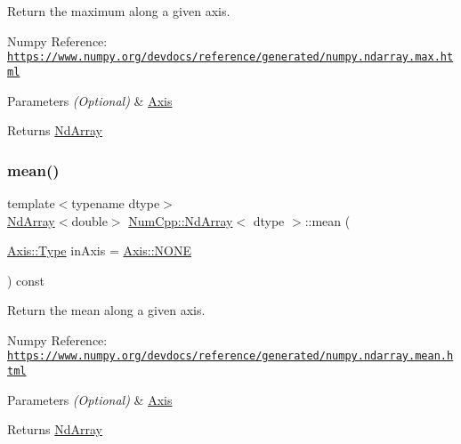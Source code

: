 Return the maximum along a given axis.

Numpy Reference\+: \href{https://www.numpy.org/devdocs/reference/generated/numpy.ndarray.max.html}{\tt https\+://www.\+numpy.\+org/devdocs/reference/generated/numpy.\+ndarray.\+max.\+html}


\begin{DoxyParams}{Parameters}
{\em (\+Optional)} & \mbox{\hyperlink{struct_num_cpp_1_1_axis}{Axis}} \\
\hline
\end{DoxyParams}
\begin{DoxyReturn}{Returns}
\mbox{\hyperlink{class_num_cpp_1_1_nd_array}{Nd\+Array}} 
\end{DoxyReturn}
\mbox{\label{class_num_cpp_1_1_nd_array_a8c5037810903a59d43d59e9056217191}} 
\subsubsection{\texorpdfstring{mean()}{mean()}}
{\footnotesize\ttfamily template$<$typename dtype$>$ \\
\mbox{\hyperlink{class_num_cpp_1_1_nd_array}{Nd\+Array}}$<$double$>$ \mbox{\hyperlink{class_num_cpp_1_1_nd_array}{Num\+Cpp\+::\+Nd\+Array}}$<$ dtype $>$\+::mean (\begin{DoxyParamCaption}\item[{\mbox{\hyperlink{struct_num_cpp_1_1_axis_ac10eb76f8631762d9ed70c40c42ca6cb}{Axis\+::\+Type}}}]{in\+Axis = {\ttfamily \mbox{\hyperlink{struct_num_cpp_1_1_axis_ac10eb76f8631762d9ed70c40c42ca6cba747ae657022cca1d87702b56d0c038e9}{Axis\+::\+N\+O\+NE}}} }\end{DoxyParamCaption}) const\hspace{0.3cm}{\ttfamily [inline]}}

Return the mean along a given axis.

Numpy Reference\+: \href{https://www.numpy.org/devdocs/reference/generated/numpy.ndarray.mean.html}{\tt https\+://www.\+numpy.\+org/devdocs/reference/generated/numpy.\+ndarray.\+mean.\+html}


\begin{DoxyParams}{Parameters}
{\em (\+Optional)} & \mbox{\hyperlink{struct_num_cpp_1_1_axis}{Axis}} \\
\hline
\end{DoxyParams}
\begin{DoxyReturn}{Returns}
\mbox{\hyperlink{class_num_cpp_1_1_nd_array}{Nd\+Array}} 
\end{DoxyReturn}
\mbox{\label{class_num_cpp_1_1_nd_array_a9ca8e600d47e4e95bc233798c5f139d2}} 

